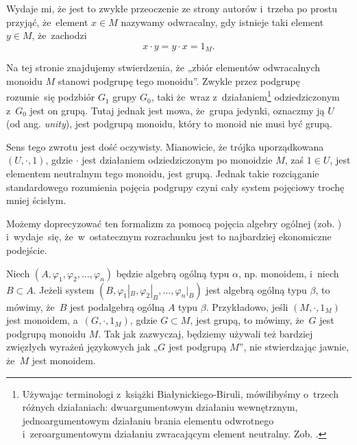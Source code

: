 \documentclass[a4paper,11pt]{article}
\begin{document}
Wydaje mi, że jest to zwykłe przeoczenie ze strony autorów i~trzeba po
prostu przyjąć, że~element $x \in M$ nazywamy odwracalny, gdy istnieje
taki element $y \in M$, że~zachodzi
\begin{equation}
  \label{eq:Forys-Forys-03}
  x \cdot y = y \cdot x = 1_{ M }.
\end{equation}

\vspace{\spaceFour}





\start {} Na tej stronie znajdujemy stwierdzenia, że „zbiór
elementów odwracalnych monoidu $M$ stanowi podgrupę tego monoidu”.
Zwykle przez podgrupę rozumie~się podzbiór $G_{ 1 }$ grupy $G_{ 0 }$,
taki że~wraz z~działaniem\footnote{Używając terminologi z~książki
  Białynickiego-Biruli, mówilibyśmy o~trzech różnych działaniach:
  dwuargumentowym działaniu wewnętrznym, jednoargumentowym działaniu
  brania elementu odwrotnego i~zeroargumentowym działaniu zwracającym
  element neutralny. Zob. \cite{BialynickiBirulaZarysAlgebry1987}.}
odziedziczonym z~$G_{ 0 }$ jest on grupą. Tutaj jednak jest mowa,
że~grupa jedynki, oznaczmy ją $U$ (od ang. \textit{unity}), jest
podgrupą monoidu, który to monoid nie musi być grupą.

Sens tego zwrotu jest dość oczywisty. Mianowicie, że trójka
uporządkowana $( U, \cdot, 1 )$, gdzie $\cdot$ jest działaniem
odziedziczonym po monoidzie $M$, zaś $1 \in U$, jest elementem
neutralnym tego monoidu, jest grupą. Jednak takie rozciąganie
standardowego rozumienia pojęcia podgrupy czyni cały system pojęciowy
trochę mniej ścisłym.

Możemy doprecyzować ten formalizm za pomocą pojęcia algebry ogólnej
(zob. \cite{BialynickiBirulaZarysAlgebry1987}) i~wydaje~się,
że~w~ostatecznym rozrachunku jest to najbardziej ekonomiczne
podejście.

Niech $( A, \varphi_{ 1 }, \varphi_{ 2 }, \ldots, \varphi_{ n } )$
będzie algebrą ogólną typu $\alpha$, np. monoidem, i~niech
$B \subset A$. Jeżeli system
$( B, \varphi_{ 1 }|_{ B }, \varphi_{ 2 }|_{ B }, \ldots, \varphi_{ n
}|_{ B } )$ jest algebrą ogólną typu $\beta$, to mówimy, że~$B$ jest
podalgebrą ogólną $A$ typu $\beta$. Przykładowo, jeśli
$( M, \cdot, 1_{ M } )$ jest monoidem, a~$( G, \cdot, 1_{ M } )$,
gdzie $G \subset M$, jest grupą, to mówimy, że~$G$ jest podgrupą
monoidu $M$. Tak jak zazwyczaj, będziemy używali też bardziej
zwięzłych wyrażeń językowych jak „$G$ jest podgrupą $M$”, nie
stwierdzając jawnie, że~$M$ jest monoidem.
\end{document}
